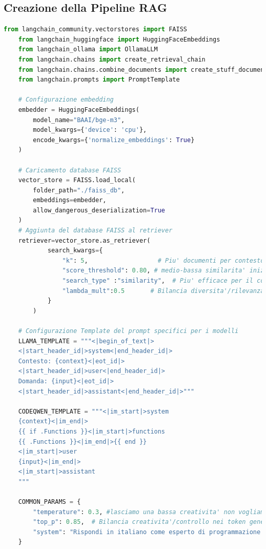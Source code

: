 \documentclass[12pt,a4paper,openright,twoside]{book}
\begin{document}
\subsection{Creazione della Pipeline RAG}
\begin{lstlisting}[language=Python, caption={Pipeline RAG}, label={lst:rag}]
    from langchain_community.vectorstores import FAISS
    from langchain_huggingface import HuggingFaceEmbeddings
    from langchain_ollama import OllamaLLM
    from langchain.chains import create_retrieval_chain
    from langchain.chains.combine_documents import create_stuff_documents_chain
    from langchain.prompts import PromptTemplate
    
    # Configurazione embedding
    embedder = HuggingFaceEmbeddings(
        model_name="BAAI/bge-m3",
        model_kwargs={'device': 'cpu'},
        encode_kwargs={'normalize_embeddings': True}
    )
    
    # Caricamento database FAISS
    vector_store = FAISS.load_local(
        folder_path="./faiss_db",
        embeddings=embedder,
        allow_dangerous_deserialization=True
    )
    # Aggiunta del database FAISS al retriever
    retriever=vector_store.as_retriever(
            search_kwargs={
                "k": 5,                   # Piu' documenti per contesto
                "score_threshold": 0.80, # medio-bassa similarita' inizialmente era 0.90
                "search_type" :"similarity",  # Piu' efficace per il codice
                "lambda_mult":0.5       # Bilancia diversita'/rilevanza
            }
        )
    
    # Configurazione Template del prompt specifici per i modelli
    LLAMA_TEMPLATE = """<|begin_of_text|>
    <|start_header_id|>system<|end_header_id|>
    Contesto: {context}<|eot_id|>
    <|start_header_id|>user<|end_header_id|>
    Domanda: {input}<|eot_id|>
    <|start_header_id|>assistant<|end_header_id|>"""
    
    CODEQWEN_TEMPLATE = """<|im_start|>system
    {context}<|im_end|>
    {{ if .Functions }}<|im_start|>functions
    {{ .Functions }}<|im_end|>{{ end }}
    <|im_start|>user
    {input}<|im_end|>
    <|im_start|>assistant
    """
    
    COMMON_PARAMS = {
        "temperature": 0.3, #lasciamo una bassa creativita' non vogliamo che inventi risposte
        "top_p": 0.85,  # Bilancia creativita'/controllo nei token generati
        "system": "Rispondi in italiano come esperto di programmazione ma solo se sei sicuro."
    }
    

\end{lstlisting}
\end{document}
